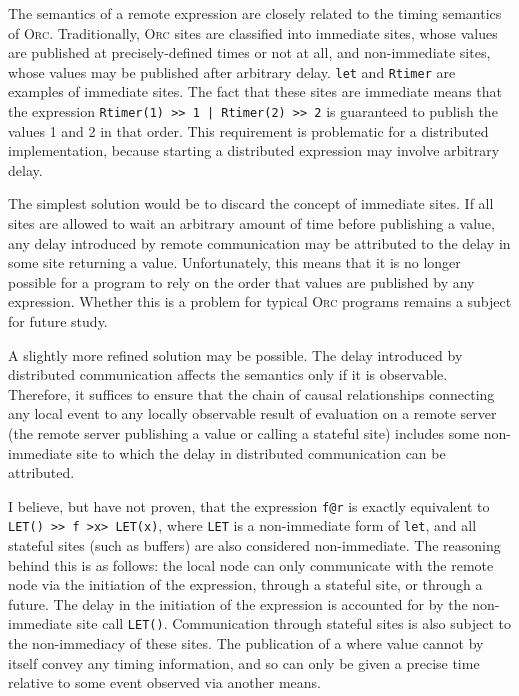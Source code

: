 \documentclass[10pt,letterpaper]{article}
\begin{document}
The semantics of a remote expression are closely related to the timing
semantics of \textsc{Orc}. Traditionally, \textsc{Orc} sites are classified
into immediate sites, whose values are published at precisely-defined times or
not at all, and non-immediate sites, whose values may be published after
arbitrary delay. \texttt{let} and \texttt{Rtimer} are examples of immediate
sites. The fact that these sites are immediate means that the expression
\texttt{Rtimer(1) >> 1 | Rtimer(2) >> 2} is guaranteed to publish the values 1
and 2 in that order.  This requirement is problematic for a distributed
implementation, because starting a distributed expression may involve arbitrary
delay.

The simplest solution would be to discard the concept of immediate sites. If
all sites are allowed to wait an arbitrary amount of time before publishing a
value, any delay introduced by remote communication may be attributed to the
delay in some site returning a value.  Unfortunately, this means that it is no
longer possible for a program to rely on the order that values are published by
any expression.  Whether this is a problem for typical \textsc{Orc} programs
remains a subject for future study.

A slightly more refined solution may be possible.  The delay introduced by
distributed communication affects the semantics only if it is observable.
Therefore, it suffices to ensure that the chain of causal relationships
connecting any local event to any locally observable result of evaluation on a
remote server (the remote server publishing a value or calling a stateful site)
includes some non-immediate site to which the delay in distributed
communication can be attributed.

I believe, but have not proven, that the expression \texttt{f@r} is exactly
equivalent to \texttt{LET() >> f >x> LET(x)}, where \texttt{LET} is a
non-immediate form of \texttt{let}, and all stateful sites (such as buffers)
are also considered non-immediate.  The reasoning behind this is as follows:
the local node can only communicate with the remote node via the initiation of
the expression, through a stateful site, or through a future. The delay in the
initiation of the expression is accounted for by the non-immediate site call
\texttt{LET()}. Communication through stateful sites is also subject to the
non-immediacy of these sites. The publication of a where value cannot by itself
convey any timing information, and so can only be given a precise time relative
to some event observed via another means.
\end{document}

